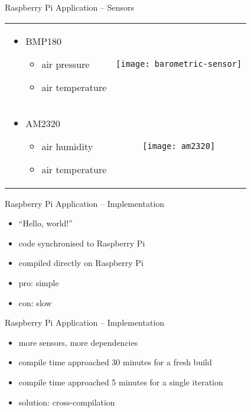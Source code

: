 \documentclass[aspectratio=1610]{beamer}
\newcommand\green[1]{{\color{green(ncs)}#1}}
\newcommand\red[1]{{\color{amaranth}#1}}
\begin{document}
  \begin{frame}{Raspberry Pi Application -- Sensors}
    \begin{tabularx}{\textwidth}{XC}
      \begin{itemize}
        \item BMP180
          \begin{itemize}
            \item air pressure
            \item air temperature
          \end{itemize}
      \end{itemize}
      &
      \texttt{[image: barometric-sensor]}
      \\
      \begin{itemize}
        \item AM2320
          \begin{itemize}
            \item air humidity
            \item air temperature
          \end{itemize}
      \end{itemize}
      &
      \texttt{[image: am2320]}
    \end{tabularx}
  \end{frame}

  \begin{frame}{Raspberry Pi Application -- Implementation}
    \begin{itemize}
      \item “Hello, world!”
      \item code synchronised to Raspberry Pi
      \item compiled directly on Raspberry Pi
      \item \green{pro:} simple
      \item \red{con:} slow
    \end{itemize}
  \end{frame}

  \begin{frame}{Raspberry Pi Application -- Implementation}
    \begin{itemize}
      \item more sensors, more dependencies
      \item compile time approached 30 minutes for a fresh build
      \item compile time approached 5 minutes for a single iteration
      \item \green{solution:} cross-compilation
    \end{itemize}
  \end{frame}
\end{document}
